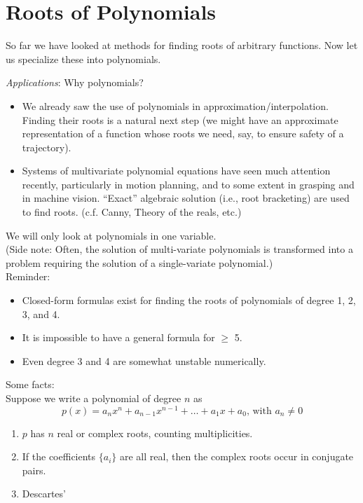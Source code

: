 \chapter{Roots of Polynomials}

So far we have looked at methods for finding roots of arbitrary functions. Now let us specialize these into polynomials. \newline

\noindent \emph{Applications}: Why polynomials?
\begin{itemize}
    \item We already saw the use of polynomials in approximation/interpolation. Finding their roots is a natural next step (we might have an approximate representation of a function whose roots we need, say, to ensure safety of a trajectory).
    \item Systems of multivariate polynomial equations have seen much attention recently, particularly in motion planning, and to some extent in grasping and in machine vision. ``Exact'' algebraic solution (i.e., root bracketing) are used to find roots. (c.f. Canny, Theory of the reals, etc.)
\end{itemize}

\hline 

\vspace{1em}

\noindent We will only look at polynomials in one variable. \\
(Side note: Often, the solution of multi-variate polynomials is transformed into a problem requiring the solution of a single-variate polynomial.) \\

\noindent Reminder: 
\begin{itemize}
    \item Closed-form formulas exist for finding the roots of polynomials of degree 1, 2, 3, and 4.
    \item It is impossible to have a general formula for $\geq$ 5.
    \item Even degree 3 and 4 are somewhat unstable numerically.
\end{itemize}

\noindent Some facts: \\
Suppose  we write a polynomial of degree $n$ as
$$p(x) = a_n x^n + a_{n-1} x^{n-1} + \dots + a_1 x + a_0\text{, with }a_n \neq 0$$

\begin{enumerate}
    \item $p$ has $n$ real or complex roots, counting multiplicities. \\
    \item If the coefficients $\{ a_i \}$ are all real, then the complex roots occur in conjugate pairs.
    \item Descartes' 
\end{enumerate}

